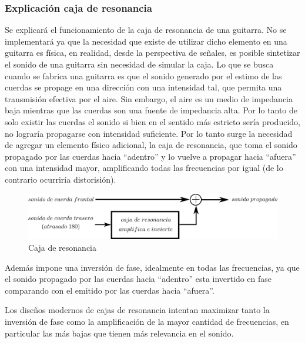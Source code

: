 \documentclass[assd_tp2_main.tex]{subfiles}
\begin{document}
\subsubsection{Explicación caja de resonancia}
Se explicará el funcionamiento de la caja de resonancia de una guitarra. No se implementar\'a ya que la necesidad que existe de utilizar dicho elemento en una guitarra es física, en realidad, desde la perspectiva de señales, es posible sintetizar el sonido de una guitarra sin necesidad de simular la caja.
Lo que se busca cuando se fabrica una guitarra es que el sonido generado por el estimo de las cuerdas se propage en una dirección con una intensidad tal, que permita una transmisión efectiva por el aire.
Sin embargo, el aire es un medio de impedancia baja mientras que las cuerdas son una fuente de impedancia alta. Por lo tanto de solo existir las cuerdas el sonido si bien en el sentido más estricto sería producido, no lograría propagarse con intensidad suficiente. 
Por lo tanto surge la necesidad de agregar un elemento f\'isico adicional, la caja de resonancia, que toma el sonido propagado por las cuerdas hacia ``adentro'' y lo vuelve a propagar hacia ``afuera'' con una intensidad mayor, amplificando todas las frecuencias por igual (de lo contrario ocurrir\'ia distorisi\'on). 
\begin{figure}[H]
	\begin{center}
	\includegraphics[scale=1.2]{graficos/caja_resonancia.png}
	\caption{Caja de resonancia}

	\end{center}
\end{figure}
Además impone una inversi\'on de fase, idealmente en todas las frecuencias, ya que el sonido propagado por las cuerdas hacia ``adentro'' esta invertido en fase comparando con el emitido por las cuerdas hacia ``afuera''.\par
Los dise\~nos modernos de cajas de resonancia intentan maximizar tanto la inversión de fase como la amplificación de la mayor cantidad de frecuencias, en particular las m\'as bajas que tienen m\'as relevancia en el sonido.
\end{document}
